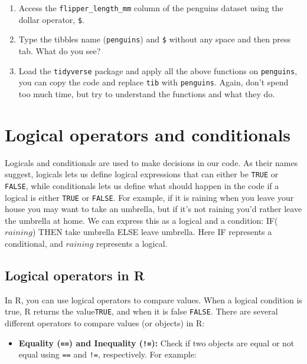 \documentclass[
  letterpaper,
  DIV=11,
  numbers=noendperiod]{scrreprt}
\providecommand{\tightlist}{%
  \setlength{\itemsep}{0pt}\setlength{\parskip}{0pt}}\usepackage{longtable,booktabs,array}
\begin{document}
\begin{enumerate}
\def\labelenumi{\arabic{enumi}.}
\setcounter{enumi}{1}
\tightlist
\item
  Access the \texttt{flipper\_length\_mm} column of the penguins dataset
  using the dollar operator, \texttt{\$}.
\item
  Type the tibbles name (\texttt{penguins}) and \texttt{\$} without any
  space and then press tab. What do you see?
\item
  Load the \texttt{tidyverse} package and apply all the above functions
  on \texttt{penguins}, you can copy the code and replace \texttt{tib}
  with \texttt{penguins}. Again, don't spend too much time, but try to
  understand the functions and what they do.
\end{enumerate}

\section{Logical operators and
conditionals}\label{logical-operators-and-conditionals}

Logicals and conditionals are used to make decisions in our code. As
their names suggest, logicals lets us define logical expressions that
can either be \texttt{TRUE} or \texttt{FALSE}, while conditionals lets
us define what should happen in the code if a logical is either
\texttt{TRUE} or \texttt{FALSE}. For example, if it is raining when you
leave your house you may want to take an umbrella, but if it's not
raining you'd rather leave the umbrella at home. We can express this as
a logical and a condition: IF(\(raining\)) THEN take umbrella ELSE leave
umbrella. Here IF represents a conditional, and \(raining\) represents a
logical.

\subsection{Logical operators in R}\label{logical-operators-in-r}

In R, you can use logical operators to compare values. When a logical
condition is true, R returns the value\texttt{TRUE}, and when it is
false \texttt{FALSE}. There are several different operators to compare
values (or objects) in R:

\begin{itemize}
\tightlist
\item
  \textbf{Equality (\texttt{==}) and Inequality (\texttt{!=}):} Check if
  two objects are equal or not equal using \texttt{==} and \texttt{!=},
  respectively. For example:
\end{itemize}
\end{document}
